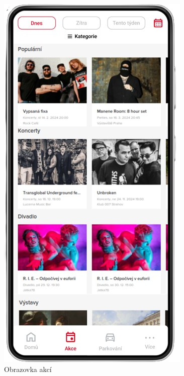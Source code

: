 \begin{figure}[H]
      \includegraphics[width=\linewidth]{screen2.png}
      \caption{Obrazovka akcí}\label{fig:screen2}
    \endminipage\hfill
\end{figure}

